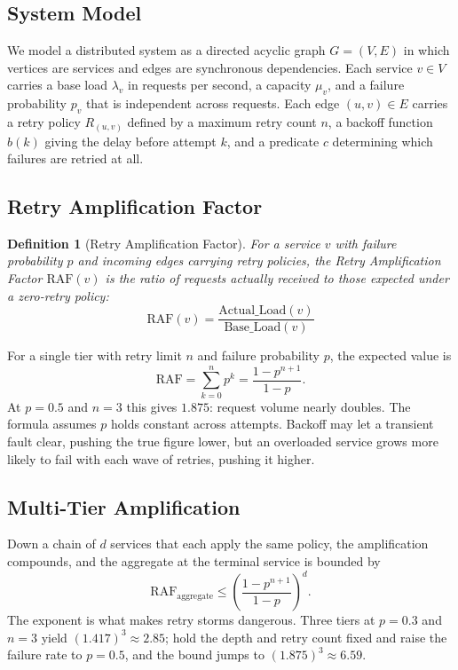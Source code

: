 \documentclass[conference]{IEEEtran}
\newtheorem{definition}{Definition}
\begin{document}
\subsection{System Model}

We model a distributed system as a directed acyclic graph $G = (V, E)$ in which vertices are services and edges are synchronous dependencies. Each service $v \in V$ carries a base load $\lambda_v$ in requests per second, a capacity $\mu_v$, and a failure probability $p_v$ that is independent across requests. Each edge $(u,v) \in E$ carries a retry policy $R_{(u,v)}$ defined by a maximum retry count $n$, a backoff function $b(k)$ giving the delay before attempt $k$, and a predicate $c$ determining which failures are retried at all.

\subsection{Retry Amplification Factor}

\begin{definition}[Retry Amplification Factor]
For a service $v$ with failure probability $p$ and incoming edges carrying retry policies, the Retry Amplification Factor $\text{RAF}(v)$ is the ratio of requests actually received to those expected under a zero-retry policy:
\begin{equation}
\text{RAF}(v) = \frac{\text{Actual\_Load}(v)}{\text{Base\_Load}(v)}
\end{equation}
\end{definition}

For a single tier with retry limit $n$ and failure probability $p$, the expected value is
\begin{equation}
\text{RAF} = \sum_{k=0}^{n} p^k = \frac{1 - p^{n+1}}{1 - p}.
\end{equation}
At $p = 0.5$ and $n = 3$ this gives $1.875$: request volume nearly doubles. The formula assumes $p$ holds constant across attempts. Backoff may let a transient fault clear, pushing the true figure lower, but an overloaded service grows more likely to fail with each wave of retries, pushing it higher.

\subsection{Multi-Tier Amplification}

Down a chain of $d$ services that each apply the same policy, the amplification compounds, and the aggregate at the terminal service is bounded by
\begin{equation}
\text{RAF}_{\text{aggregate}} \leq \left(\frac{1 - p^{n+1}}{1 - p}\right)^d.
\end{equation}
The exponent is what makes retry storms dangerous. Three tiers at $p = 0.3$ and $n = 3$ yield $(1.417)^3 \approx 2.85$; hold the depth and retry count fixed and raise the failure rate to $p = 0.5$, and the bound jumps to $(1.875)^3 \approx 6.59$.
\end{document}
